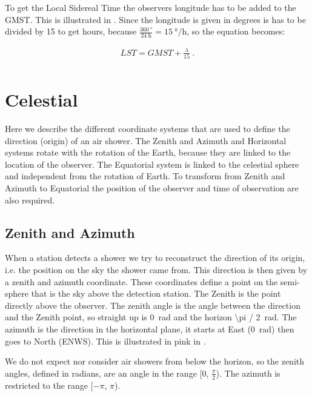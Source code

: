To get the Local Sidereal Time the observers longitude has to be added
to the GMST. This is illustrated in . Since
the longitude is given in degrees is has to be divided by 15 to get
hours, because $\frac{\SI{360}{\degree}}{\SI{24}{\hour}} =
\SI{15}{\degree\per\hour}$, so the equation becomes:

\begin{equation}
    \begin{array}{l}
        \mathit{LST} = \mathit{GMST} + \frac{\lambda}{15} \ . \\
    \end{array}
\end{equation}


\section{Celestial}
\label{sec:celestial}

Here we describe the different coordinate systems that are used to
define the direction (origin) of an air shower. The Zenith and Azimuth
and Horizontal systems rotate with the rotation of the Earth, because
they are linked to the location of the observer. The Equatorial system
is linked to the celestial sphere and independent from the rotation of
Earth. To transform from Zenith and Azimuth to Equatorial the position
of the observer and time of observation are also required.


\subsection{Zenith and Azimuth}

When a station detects a shower we try to reconstruct the direction of
its origin, i.e. the position on the sky the shower came from. This
direction is then given by a zenith and azimuth coordinate. These
coordinates define a point on the semi-sphere that is the sky above the
detection station. The Zenith is the point directly above the observer.
The zenith angle is the angle between the direction and the Zenith
point, so straight up is \SI{0}{\radian} and the horizon \SI{\pi /
2}{\radian}. The azimuth is the direction in the horizontal plane, it
starts at East (\SI{0}{\radian}) then goes to North (ENWS). This is
illustrated in pink in .

We do not expect nor consider air showers from below the horizon, so the
zenith angles, defined in radians, are an angle in the range [0,
$\frac{\pi}{2}$). The azimuth is restricted to the range [$-\pi$, $\pi$).

